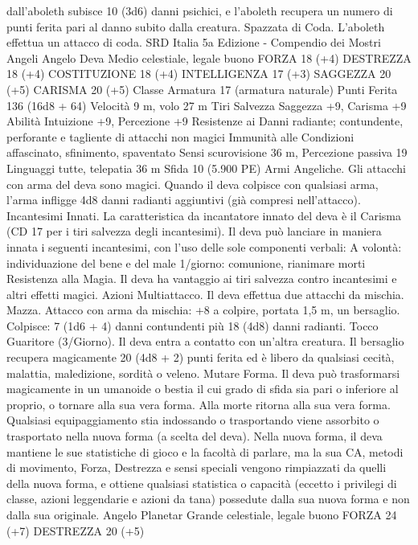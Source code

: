 \begin{multicols}{2}
dall’aboleth subisce 10 (3d6) danni psichici, e l’aboleth recupera un
numero di punti ferita pari al danno subito dalla creatura.
Spazzata di Coda. L’aboleth effettua un attacco di coda.
SRD Italia 5a Edizione - Compendio dei Mostri
Angeli
Angelo Deva
Medio celestiale, legale buono
FORZA 18 (+4)
DESTREZZA 18 (+4)
COSTITUZIONE 18 (+4)
INTELLIGENZA 17 (+3)
SAGGEZZA 20 (+5)
CARISMA 20 (+5)
Classe Armatura 17 (armatura naturale)
Punti Ferita 136 (16d8 + 64)
Velocità 9 m, volo 27 m
Tiri Salvezza Saggezza +9, Carisma +9
Abilità Intuizione +9, Percezione +9
Resistenze ai Danni radiante; contundente, perforante e tagliente
di attacchi non magici
Immunità alle Condizioni affascinato, sfinimento, spaventato
Sensi scurovisione 36 m, Percezione passiva 19
Linguaggi tutte, telepatia 36 m
Sfida 10 (5.900 PE)
Armi Angeliche. Gli attacchi con arma del deva sono magici.
Quando il deva colpisce con qualsiasi arma, l’arma infligge 4d8
danni radianti aggiuntivi (già compresi nell’attacco).
Incantesimi Innati. La caratteristica da incantatore innato del
deva è il Carisma (CD 17 per i tiri salvezza degli incantesimi). Il
deva può lanciare in maniera innata i seguenti incantesimi, con
l’uso delle sole componenti verbali:
A volontà: individuazione del bene e del male
1/giorno: comunione, rianimare morti
Resistenza alla Magia. Il deva ha vantaggio ai tiri salvezza
contro incantesimi e altri effetti magici.
Azioni
Multiattacco. Il deva effettua due attacchi da mischia.
Mazza. Attacco con arma da mischia: +8 a colpire, portata 1,5
m, un bersaglio.
Colpisce: 7 (1d6 + 4) danni contundenti più 18 (4d8) danni radianti.
Tocco Guaritore (3/Giorno). Il deva entra a contatto con un’altra
creatura. Il bersaglio recupera magicamente 20 (4d8 + 2) punti
ferita ed è libero da qualsiasi cecità, malattia, maledizione,
sordità o veleno.
Mutare Forma. Il deva può trasformarsi magicamente in un
umanoide o bestia il cui grado di sfida sia pari o inferiore al proprio,
o tornare alla sua vera forma. Alla morte ritorna alla sua vera forma.
Qualsiasi equipaggiamento stia indossando o trasportando viene
assorbito o trasportato nella nuova forma (a scelta del deva).
Nella nuova forma, il deva mantiene le sue statistiche di gioco e la
facoltà di parlare, ma la sua CA, metodi di movimento, Forza,
Destrezza e sensi speciali vengono rimpiazzati da quelli della nuova
forma, e ottiene qualsiasi statistica o capacità (eccetto i privilegi di
classe, azioni leggendarie e azioni da tana) possedute dalla sua nuova
forma e non dalla sua originale.
Angelo Planetar
Grande celestiale, legale buono
FORZA 24 (+7)
DESTREZZA 20 (+5)

\end{multicols}

